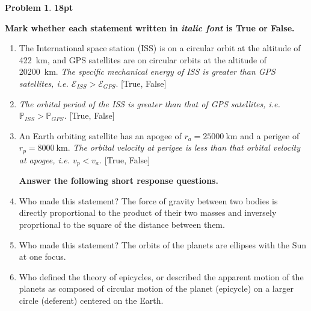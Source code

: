 \documentclass[10pt]{article}
\theoremstyle{definition}
\newtheorem{prob}{Problem}[section]
\renewcommand{\theprob}{\arabic{prob}}
\newenvironment{subprob}%
{\renewcommand{\theenumi}{\alph{enumi}}\renewcommand{\labelenumi}{(\theenumi)}\begin{enumerate}}%
{\end{enumerate}}%
\begin{document}
\clearpage\newpage
\begin{prob}
    \textbf{18pt} 
    
    \textbf{Mark whether each statement written in \textit{italic font} is True or False.}
\begin{subprob}

    \item The International space station (ISS) is on a circular orbit at the altitude of \SI{422}{\kilo\meter}, and GPS satellites are on circular orbits at the altitude of \SI{20200}{\kilo\meter}. \textit{The specific mechanical energy of ISS is greater than GPS satellites, i.e. $\mathcal{E}_{ISS} > \mathcal{E}_{GPS}$}. [True, False]

    \vspace*{1cm}

\item \textit{The orbital period of the ISS is greater than that of GPS satellites, i.e. $\mathbb{P}_{ISS} > \mathbb{P}_{GPS}$.} [True, False]

    \vspace*{1cm}
    
\item An Earth orbiting satellite has an apogee of \( r_a = \SI{25000}{\kilo\meter} \) and a perigee of \( r_p = \SI{8000}{\kilo\meter} \). 
    \textit{The orbital velocity at perigee is less than that orbital velocity at apogee, i.e. \( v_p < v_a \).} [True, False]

    \vspace*{1cm}
\textbf{Answer the following short response questions.}

    \item Who made this statement? The force of gravity between two bodies is directly proportional to the product of their two masses and inversely proprtional to the square of the distance between them.

    \vspace*{1cm}

    \item Who made this statement? The orbits of the planets are ellipses with the Sun at one focus.

    \vspace*{1cm}

    \item Who defined the theory of epicycles, or described the apparent motion of the planets as composed of circular motion of the planet (epicycle) on a larger circle (deferent) centered on the Earth.


\end{subprob}
\end{prob}
\end{document}
